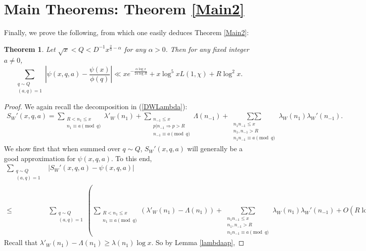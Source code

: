 \documentclass{amsart}
\newtheorem{theorem}{Theorem}[section]
\begin{document}
\section{Main Theorems: Theorem \ref{Main2}}\label{final2}

Finally, we prove the following, from which one easily deduces Theorem \ref{Main2}:

\begin{theorem}
Let $\sqrt x<Q<D^{-1}x^{\frac 23-\alpha}$ for any $\alpha>0$.  Then for any fixed integer $a\neq 0$,
$$\sum_{\substack{q\sim Q \\ (a,q)=1}}\left|\psi(x,q,a)-\frac{\psi(x)}{\phi(q)}\right|\ll xe^{-\frac{\alpha\log x}{24\log R}
}+x\log^5 xL(1,\chi)+R\log^2 x.$$
\end{theorem}

\begin{proof}
We again recall the decomposition in (\ref{DWLambda}):
\begin{gather}
S_W'(x,q,a)=\sum_{\substack{R<n_1\leq x \\ n_1\equiv a\pmod q}}\lambda'_W\left(n_1\right)+\sum_{\substack{n_{-1}\leq x \\ p|n_{-1}\Rightarrow p>R \\ n_{-1}\equiv a\pmod q}}\Lambda\left(n_{-1}\right)+\mathop{\sum\sum}\limits_{\substack{n_1n_{-1}\leq x \\ n_1,n_{-1}>R \\ n_1n_{-1}\equiv a\pmod q}}\lambda_W\left(n_1\right) \lambda_W'\left(n_{-1}\right).
\end{gather}
We show first that when summed over $q\sim Q$, $S_W'(x,q,a)$ will generally be a good approximation for $\psi(x,q,a)$.  To this end,
\begin{align*}
\sum_{\substack{q\sim Q  \\ (a,q)=1}}&\left|S_W'(x,q,a)-\psi(x,q,a)\right|\\
\leq &\sum_{\substack{q\sim Q  \\ (a,q)=1}}\left(\sum_{\substack{R<n_1\leq x \\ n_1\equiv a\pmod q}}\left(\lambda'_W\left(n_1\right)-\Lambda(n_1)\right)+\mathop{\sum\sum}\limits_{\substack{n_1n_{-1}\leq x \\ n_1,n_{-1}>R \\ n_1n_{-1}\equiv a\pmod q}}\lambda_W\left(n_1\right) \lambda_W'\left(n_{-1}\right)+O\left(R\log^2 x\right)\right)
\end{align*}
Recall that $\lambda'_W\left(n_1\right)-\Lambda(n_1)\geq \lambda(n_1)\log x$.  So by Lemma \ref{lambdaap},

\end{proof}
\end{document}
